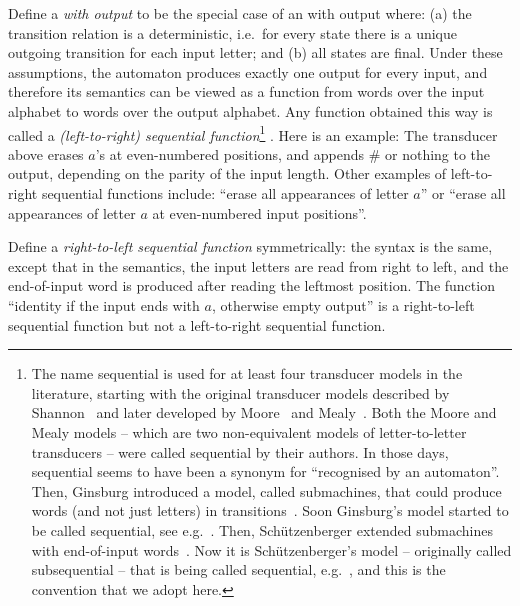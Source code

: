  Define a \emph{\dfa with output} to be the special case of an \nfa with output where: (a) the transition relation is a deterministic, i.e.~for every state there is a unique outgoing transition for each input letter; and (b) all states are final. Under these assumptions, the automaton produces exactly one output for every input, and therefore its  semantics can be viewed as a function from words over the input alphabet to words over the output alphabet. Any function obtained this way is called  a \emph{(left-to-right) sequential function}\footnote{ The name sequential is used for  at least four transducer models in the literature, starting with the original transducer models described by Shannon~\cite[Section 8]{shannon1948mathematical} and later developed by  Moore~\cite{Moore:gu}
  and Mealy~\cite{Mealy:1955hu}. Both the Moore and Mealy models -- which are two non-equivalent models of letter-to-letter transducers -- were called sequential by their authors. In those days, sequential seems to have been a synonym for ``recognised by an automaton''. Then, Ginsburg introduced a model, called submachines, that could produce  words (and not just letters) in transitions~\cite{Ginsburg:1960ca}. Soon Ginsburg's model started to be called sequential, see e.g.~\cite[p.~298]{Eilenberg:1974vl}. Then,  Sch\"utzenberger extended submachines with end-of-input words~\cite{Schutzenberger:1977ck}. Now  it is Sch\"utzenberger's model -- originally called subsequential -- that is  being called sequential, e.g.~\cite{Filiot:2016iw}, and this is the convention that we adopt here.   }
.  Here is  an example: 
 The transducer above erases $a$'s at even-numbered positions, and appends $\#$ or nothing to the output, depending on the parity of the input length.
Other examples of  left-to-right sequential functions  include: ``erase all appearances of letter $a$'' or ``erase all appearances of letter $a$ at even-numbered input positions''.

  Define a \emph{right-to-left sequential function} symmetrically: the syntax is the same, except that in the semantics, the input letters are read from right to left, and the end-of-input word is produced after reading the leftmost position. The function ``identity if the input ends with $a$, otherwise empty output'' is a right-to-left sequential function but not a left-to-right sequential function.


 

